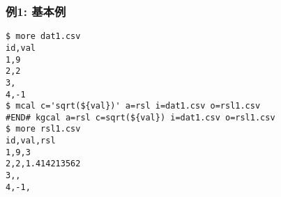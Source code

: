 \subsubsection*{例1: 基本例}



\begin{Verbatim}[baselinestretch=0.7,frame=single]
$ more dat1.csv
id,val
1,9
2,2
3,
4,-1
$ mcal c='sqrt(${val})' a=rsl i=dat1.csv o=rsl1.csv
#END# kgcal a=rsl c=sqrt(${val}) i=dat1.csv o=rsl1.csv
$ more rsl1.csv
id,val,rsl
1,9,3
2,2,1.414213562
3,,
4,-1,
\end{Verbatim}
